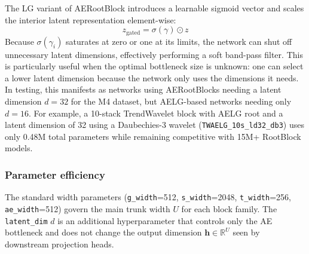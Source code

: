 \documentclass{article}
\begin{document}
The LG variant of AERootBlock introduces a learnable sigmoid vector and scales the interior latent representation element-wise:
\begin{equation*}
z_{\text{gated}} = \sigma(\gamma) \odot z
\end{equation*}
Because $\sigma(\gamma_i)$ saturates at zero or one at its limits, the network can shut off unnecessary latent dimensions, effectively performing a soft band-pass filter. This is particularly useful when the optimal bottleneck size is unknown: one can select a lower latent dimension because the network only uses the dimensions it needs. In testing, this manifests as networks using AERootBlocks needing a latent dimension $d = 32$ for the M4 dataset, but AELG-based networks needing only $d = 16$. For example, a 10-stack TrendWavelet block with AELG root and a latent dimension of 32 using a Daubechies-3 wavelet (\texttt{TWAELG\_10s\_ld32\_db3}) uses only 0.48M total parameters while remaining competitive with 15M+ RootBlock models.

\begin{table}
  \caption{Backbone architecture comparison.}
  \label{tab:backbones}
  \centering
\end{table}

\subsubsection{Parameter efficiency}

The standard width parameters (\texttt{g\_width}=512, \texttt{s\_width}=2048, \texttt{t\_width}=256, \texttt{ae\_width}=512) govern the main trunk width $U$ for each block family. The \texttt{latent\_dim} $d$ is an additional hyperparameter that controls only the AE bottleneck and does not change the output dimension $\mathbf{h} \in \mathbb{R}^U$ seen by downstream projection heads.
\end{document}
